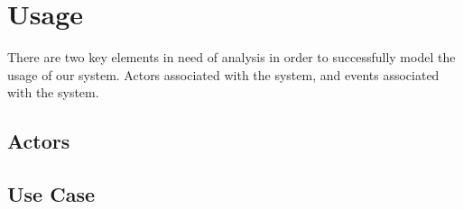 \section{Usage}

There are two key elements in need of analysis in order to successfully model the usage of our system. Actors associated with the system, and events associated with the system.




\subsection{Actors}


\subsection{Use Case}


